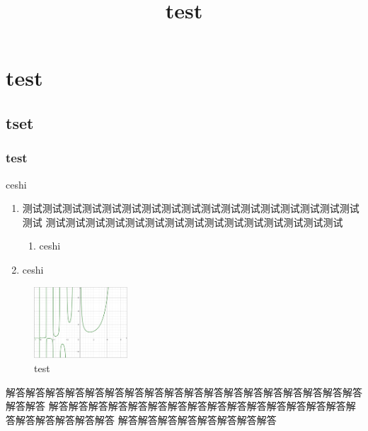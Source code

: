 \documentclass[cn,chinese]{elegantbook}
\title{test}
\begin{document}
    \chapter{test}
        \section{tset}
            \subsection{test}
            \begin{exercise}
                ceshi 
                \begin{enumerate}
                    \item 测试测试测试测试测试测试测试测试测试测试测试测试测试测试测试测试测试测试
                    测试测试测试测试测试测试测试测试测试测试测试测试测试测试测试
                    \begin{enumerate}
                        \item ceshi
                    \end{enumerate}
                    \item ceshi
                \end{enumerate}
            \end{exercise}
            \begin{figure}
                \vspace{-0.5cm}
                \includegraphics[width=3.5cm]{example.png}
                \caption{test}
            \end{figure}
            \begin{solution}
                解答解答解答解答解答解答解答解答解答解答解答解答解答解答解答解答解答解答解答解答
                解答解答解答解答解答解答解答解答解答解答解答解答解答解答解答解答解答解答解答解答解答
                解答解答解答解答解答解答解答解答
            \end{solution}
\end{document}

